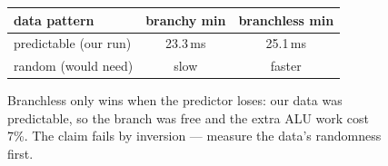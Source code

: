 \begin{figure}[htbp]
\centering
\begin{tabular}{lcc}
\toprule
data pattern & branchy min & branchless min \\
\midrule
predictable (our run) & 23.3\,ms & 25.1\,ms \\
random (would need) & slow & faster \\
\bottomrule
\end{tabular}
\caption{Branchless only wins when the predictor loses: our data was
predictable, so the branch was free and the extra ALU work cost
7\%. The claim fails by inversion --- measure the data's
randomness first.}
\label{fig:branch17}
\end{figure}

